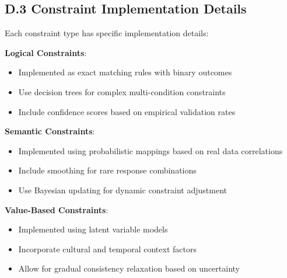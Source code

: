 \documentclass[sigconf, anonymous]{acmart}
\begin{document}
\subsection*{D.3 Constraint Implementation Details}

Each constraint type has specific implementation details:

\textbf{Logical Constraints}:
\begin{itemize}
    \item Implemented as exact matching rules with binary outcomes
    \item Use decision trees for complex multi-condition constraints
    \item Include confidence scores based on empirical validation rates
\end{itemize}

\textbf{Semantic Constraints}:
\begin{itemize}
    \item Implemented using probabilistic mappings based on real data correlations
    \item Include smoothing for rare response combinations
    \item Use Bayesian updating for dynamic constraint adjustment
\end{itemize}

\textbf{Value-Based Constraints}:
\begin{itemize}
    \item Implemented using latent variable models
    \item Incorporate cultural and temporal context factors
    \item Allow for gradual consistency relaxation based on uncertainty
\end{itemize}
\end{document}
